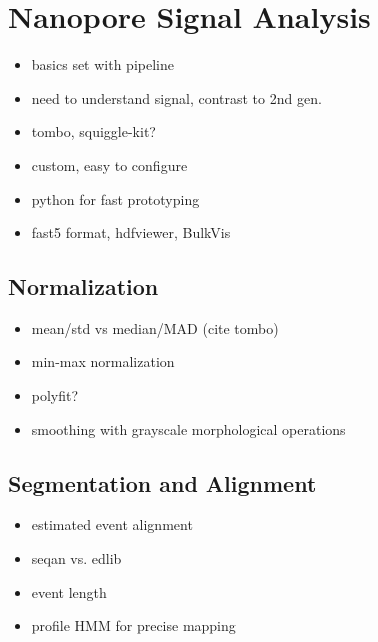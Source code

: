 \chapter{Nanopore Signal Analysis}
\label{sec:signal}

\begin{itemize}
	\item basics set with pipeline
	\item need to understand signal, contrast to 2nd gen.
	\item tombo, squiggle-kit?
	\item custom, easy to configure
	\item python for fast prototyping
	\item fast5 format, hdfviewer, BulkVis
\end{itemize}

\section{Normalization}
\label{sec:signal:normalization}

\begin{itemize}
	\item mean/std vs median/MAD (cite tombo)
	\item min-max normalization
	\item polyfit?
	\item smoothing with grayscale morphological operations
\end{itemize}

\section{Segmentation and Alignment}
\label{sec:signal:alignment}



\begin{itemize}
	\item estimated event alignment
	\item seqan vs. edlib
	\item event length
	\item profile HMM for precise mapping
\end{itemize}

